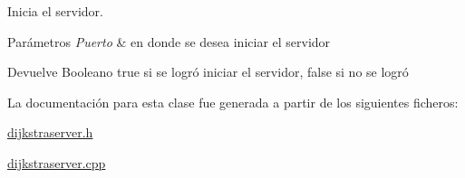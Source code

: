 Inicia el servidor. 


\begin{DoxyParams}{Parámetros}
{\em Puerto} & en donde se desea iniciar el servidor \\
\hline
\end{DoxyParams}
\begin{DoxyReturn}{Devuelve}
Booleano true si se logró iniciar el servidor, false si no se logró 
\end{DoxyReturn}


La documentación para esta clase fue generada a partir de los siguientes ficheros\+:\begin{DoxyCompactItemize}
\item 
\hyperlink{dijkstraserver_8h}{dijkstraserver.\+h}\item 
\hyperlink{dijkstraserver_8cpp}{dijkstraserver.\+cpp}\end{DoxyCompactItemize}
